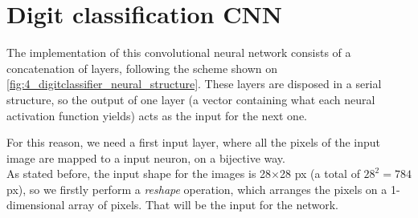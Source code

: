 	\section{Digit classification CNN}

		The implementation of this convolutional neural network consists of a concatenation of layers, following the scheme shown on \autoref{fig:4_digitclassifier_neural_structure}. These layers are disposed in a serial structure, so the output of one layer (a vector containing what each neural activation function yields) acts as the input for the next one.
		
		For this reason, we need a first input layer, where all the pixels of the input image are mapped to a input neuron, on a bijective way.\\
		
		As stated before, the input shape for the images is 28$\times$28 px (a total of $28^2 = 784$ px), so we firstly perform a \emph{reshape} operation, which arranges the pixels on a 1-dimensional array of pixels. That will be the input for the network.
		
